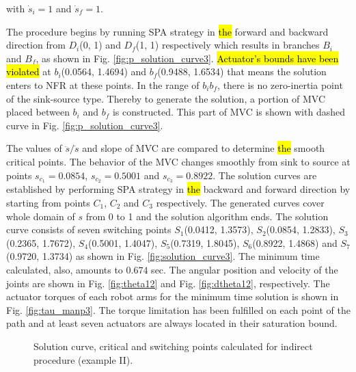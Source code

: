 \documentclass{rob}%
\begin{document}
\noindent
with $ \dot s_i=1 $ and $ \dot s_f=1 $.

The procedure begins by running SPA strategy in \hl{the} forward and backward direction from $ D_i $(0, 1) and $ D_f $(1, 1) respectively which results in branches $ B_i $ and $ B_f $, as shown in Fig. \ref{fig:p_solution_curve3}. \hl{Actuator's bounds have been violated} at $ b_i $(0.0564, 1.4694) and $ b_f $(0.9488, 1.6534) that means the solution enters to NFR at these points.
In the range of $ b_ib_f $, there is no zero-inertia point of the sink-source type. Thereby to generate the solution, a portion of MVC placed between $ b_i $ and $ b_f $ is constructed. This part of MVC is shown with dashed curve in Fig. \ref{fig:p_solution_curve3}.


The values of $ \ddot s / \dot s $ and slope of MVC are compared to determine \hl{the} smooth critical points.  
The behavior of the MVC changes smoothly from sink to source at points $ s_{c_1} = 0.0854 $, $ s_{c_2} = 0.5001 $ and $ s_{c_3} = 0.8922 $.
The solution curves are established by performing SPA strategy in \hl{the} backward and forward direction by starting from points $ C_1 $, $ C_2 $ and $ C_3 $ respectively. The generated curves cover whole domain of $ s $ from 0 to 1 and the solution algorithm ends. 
The solution curve consists of seven switching points $ S_1 $(0.0412, 1.3573), $ S_2 $(0.0854, 1.2833), $ S_3 $(0.2365, 1.7672), $ S_4 $(0.5001, 1.4047), $ S_5 $(0.7319, 1.8045), $ S_6 $(0.8922, 1.4868) and $ S_7 $(0.9720, 1.3734) as shown in Fig. \ref{fig:solution_curve3}. The minimum time calculated, also, amounts to $ 0.674 $ sec. The angular position and velocity of the joints are shown in Fig. \ref{fig:theta12} and Fig. \ref{fig:dtheta12}, respectively.
The actuator torques of each robot arms for the minimum time solution is shown in Fig. \ref{fig:tau_manp3}. The torque limitation has been fulfilled on each point of the path and at least seven actuators are always located in their saturation bound.

\begin{figure}[!t]
	\centering
	\hfil
	\caption{Solution curve, critical and switching points calculated for indirect procedure (example II).}
\end{figure}
\end{document}
